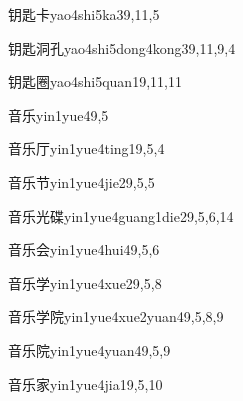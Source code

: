\begin{verbete}{钥匙卡}{yao4shi5ka3}{9,11,5}
\end{verbete}

\begin{verbete}{钥匙洞孔}{yao4shi5dong4kong3}{9,11,9,4}
\end{verbete}

\begin{verbete}{钥匙圈}{yao4shi5quan1}{9,11,11}
\end{verbete}

\begin{verbete}{音乐}{yin1yue4}{9,5}
\end{verbete}

\begin{verbete}{音乐厅}{yin1yue4ting1}{9,5,4}
\end{verbete}

\begin{verbete}{音乐节}{yin1yue4jie2}{9,5,5}
\end{verbete}

\begin{verbete}{音乐光碟}{yin1yue4guang1die2}{9,5,6,14}
\end{verbete}

\begin{verbete}{音乐会}{yin1yue4hui4}{9,5,6}
\end{verbete}

\begin{verbete}{音乐学}{yin1yue4xue2}{9,5,8}
\end{verbete}

\begin{verbete}{音乐学院}{yin1yue4xue2yuan4}{9,5,8,9}
\end{verbete}

\begin{verbete}{音乐院}{yin1yue4yuan4}{9,5,9}
\end{verbete}

\begin{verbete}{音乐家}{yin1yue4jia1}{9,5,10}
\end{verbete}

